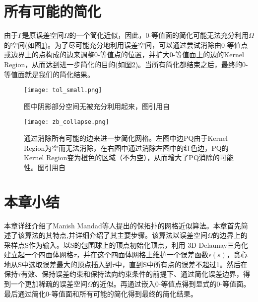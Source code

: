 \section{所有可能的简化}
由于$\Gamma$是原误差空间$\Omega$的一个简化近似，因此，0-等值面的简化可能无法充分利用$\Omega$的空间(如图\ref{fig:tol-small})。为了尽可能充分地利用误差空间，可以通过尝试消除由0-等值点或边界上的点构成的边来调整0-等值点的位置，并扩大0-等值面上的边的Kernel Region，从而达到进一步简化的目的(如图\ref{fig:all-edges-collapse})。当所有简化都结束之后，最终的0-等值面就是我们的简化结果。

\begin{figure}[htbp]
    \centering
    \texttt{[image: tol\_small.png]}
    \caption[无法利用的误差空间]{图中阴影部分空间无被充分利用起来，图引用自\cite{isotopic-appro}}
    \label{fig:tol-small}
\end{figure}

\begin{figure}[htbp]
    \centering
    \texttt{[image: zb\_collapse.png]}
    \caption[所有可能的边的消除]{通过消除所有可能的边来进一步简化网格。左图中边PQ由于Kernel Region为空而无法消除，在右图中通过消除左图中的红色边，PQ的Kernel Region变为橙色的区域（不为空），从而增大了PQ消除的可能性。图引用自\cite{isotopic-appro}}
    \label{fig:all-edges-collapse}
\end{figure}

\section{本章小结}
本章详细介绍了Manish Mandad等人提出的保拓扑的网格近似算法\cite{isotopic-appro}。本章首先简述了该算法的其特点,并详细介绍了其主要步骤。该算法以误差空间$\Omega$的边界上的采样点S作为输入。以S的包围球上的顶点初始化顶点，利用 3D Delaunay三角化建立起一个四面体网格$\tau$，并在这个四面体网格上维护一个误差函数$\epsilon(s)$，贪心地从S中选取误差最大的顶点插入到$\tau$中，直到S中所有点的误差不超过1。然后在保持$\tau$有效、保持误差约束和保持法向约束条件的前提下、通过简化误差边界，得到一个更加稀疏的误差空间$\Omega$的近似。再通过嵌入0-等值点得到显式的0-等值面。最后通过简化0-等值面和所有可能的简化得到最终的简化结果。

